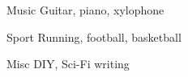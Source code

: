 


\begin{cvskills}


\cvskill
{Music} %
{Guitar, piano, xylophone} %


\cvskill
{Sport} %
{Running, football, basketball} %


\cvskill
{Misc} %
{DIY, Sci-Fi writing} %


\end{cvskills}